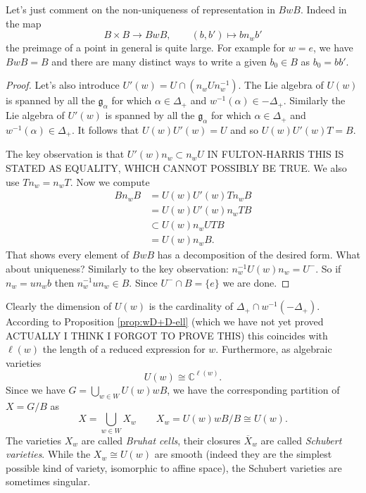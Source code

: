 \documentclass[12pt]{article}
\theoremstyle{plain}
\theoremstyle{definition}
\numberwithin{equation}{section}
\newcommand{\ov}[1]{\overline#1}
\newcommand{\al}{\alpha}
\newcommand{\D}{\Delta}
\newcommand{\C}{\mathbb{C}}
\newcommand{\g}{\mathfrak{g}}
\begin{document}
Let's just comment on the non-uniqueness of representation in $B w B$. Indeed in the map
\[
B \times B \rightarrow BwB, \qquad (b, b') \mapsto b n_w b'
\]
the preimage of a point in general is quite large. For example for $w = e$, we have $BwB = B$ and there are many distinct ways to write a given $b_0 \in B$ as $b_0 = bb'$.

\begin{proof}
Let's also introduce $U'(w) = U \cap (n_w U n_w^{-1})$. The Lie algebra of $U(w)$ is spanned by all the $\g_{\alpha}$ for which $\alpha \in \D_+$ and $w^{-1}(\al) \in -\D_+$. Similarly the Lie algebra of $U'(w)$ is spanned by all the $\g_{\alpha}$ for which $\alpha \in \D_+$ and $w^{-1}(\al) \in \D_+$. It follows that $U(w)U'(w) = U$ and so $U(w)U'(w)T = B$.

The key observation is that $U'(w) n_w \subset n_w U$ {\color{red}IN FULTON-HARRIS THIS IS STATED AS EQUALITY, WHICH CANNOT POSSIBLY BE TRUE}. We also use $T n_w = n_w T$. Now we compute
\begin{align*}
B n_w B &= U(w) U'(w) T n_w B \\
&= U(w) U'(w) n_w T B \\
&\subset U(w) n_w U T B \\
&= U(w) n_w B.
\end{align*}
That shows every element of $BwB$ has a decomposition of the desired form. What about uniqueness? Similarly to the key observation: $n_w^{-1} U(w) n_w = U^-$. So if $n_w = u n_w b$ then $n_w^{-1} u n_w \in B$. Since $U^- \cap B = \{e\}$ we are done.
\end{proof}

Clearly the dimension of $U(w)$ is the cardinality of $\D_+ \cap w^{-1}(-\D_+)$. According to Proposition \ref{prop:wD+D-ell} (which we have not yet proved {\color{red}ACTUALLY I THINK I FORGOT TO PROVE THIS}) this coincides with $\ell(w)$ the length of a reduced expression for $w$. Furthermore, as algebraic varieties
\[
U(w) \cong \C^{\ell(w)}.
\]
Since we have $G = \bigcup_{w \in W} U(w) w B$, we have the corresponding partition of $X = G / B$ as
\[
X = \bigcup_{w \in W} X_w \qquad X_w = U(w) w B / B \cong U(w).
\]
The varieties $X_w$ are called \emph{Bruhat cells}, their closures $\ov X_w$ are called \emph{Schubert varieties}. While the $X_w \cong U(w)$ are smooth (indeed they are the simplest possible kind of variety, isomorphic to affine space), the Schubert varieties are sometimes singular.
\end{document}
